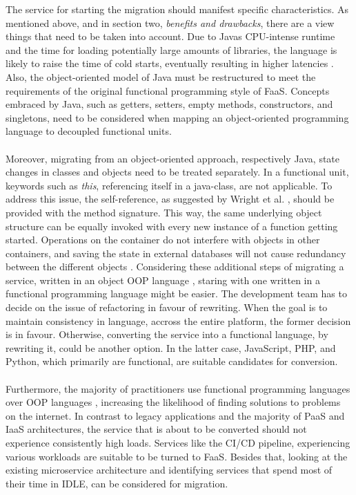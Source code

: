 \documentclass[11pt]{article}
\begin{document}
The service for starting the migration should manifest specific characteristics. As mentioned above, and in section two, \textit{benefits and drawbacks}, there are a view things that need to be taken into account. Due to Javas CPU-intense runtime and the time for loading potentially large amounts of libraries, the language is likely to raise the time of cold starts, eventually resulting in higher latencies \cite{bardsley2018serverless}. Also, the object-oriented model of Java must be restructured to meet the requirements of the original functional programming style of FaaS. Concepts embraced by Java, such as getters, setters, empty methods, constructors, and singletons, need to be considered when mapping an object-oriented programming language to decoupled functional units.\\\\ Moreover, migrating from an object-oriented approach, respectively Java, state changes in classes and objects need to be treated separately. In a functional unit, keywords such as \textit{this}, referencing itself in a java-class, are not applicable. To address this issue, the self-reference, as suggested by Wright et al. \cite{wright1998compiling}, should be provided with the method signature. This way, the same underlying object structure can be equally invoked with every new instance of a function getting started. Operations on the container do not interfere with objects in other containers, and saving the state in external databases will not cause redundancy between the different objects \cite{spillner2017java}. Considering these additional steps of migrating a service, written in an object OOP language \cite{leitner2019mixed}, staring with one written in a functional programming language might be easier. The development team has to decide on the issue of refactoring in favour of rewriting. When the goal is to maintain consistency in language, accross the entire platform, the former decision is in favour. Otherwise, converting the service into a functional language, by rewriting it, could be another option. In the latter case, JavaScript, PHP, and Python, which primarily are functional, are suitable candidates for conversion.\\\\ Furthermore, the majority of practitioners use functional programming languages over OOP languages \cite{leitner2019mixed}, increasing the likelihood of finding solutions to problems on the internet. In contrast to legacy applications and the majority of PaaS and IaaS architectures, the service that is about to be converted should not experience consistently high loads. Services like the CI/CD pipeline, experiencing various workloads are suitable to be turned to FaaS. Besides that, looking at the existing microservice architecture and identifying services that spend most of their time in IDLE, can be considered for migration.
\end{document}
